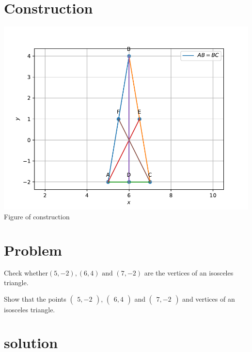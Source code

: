 \documentclass[10pt, a4paper]{article}
\title{\mytitle}
\author{\myauthor\hspace{1em}\\\contact\\FWC220107\hspace{6.5em}IITH\hspace{0.5em}\mymodule\hspace{6em}ASSIGN-1}
\date{}
\newcommand{\myvec}[1]{\ensuremath{\begin{pmatrix}#1\end{pmatrix}}}
\begin{document}
 \maketitle
 \tableofcontents
\section{Construction}                                                                    \begin{center}
  \includegraphics[scale=0.39]{par.pdf}
\\  Figure of construction
   \end{center}
 
   \section{Problem}
  Check whether$(5,-2),(6,4) \text{ and } (7,-2)$ are the vertices of an isosceles triangle.
   
Show that the points $\myvec{5, -2}$, $\myvec{6,4}$ and $\myvec{7, -2}$ and vertices of an isosceles  triangle.
 \section{solution} 
\end{document}
